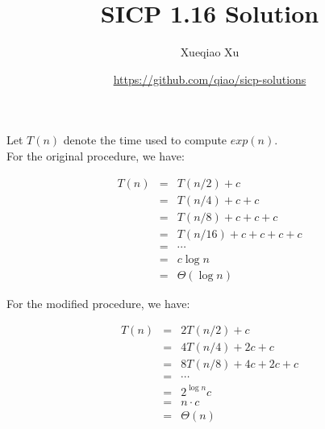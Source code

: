 \documentclass{article}
\begin{document}
\title{SICP 1.16 Solution}
\author{Xueqiao Xu}
\date{\url{https://github.com/qiao/sicp-solutions}}
\maketitle

Let $T(n)$ denote the time used to compute $exp(n)$.\\

For the original procedure, we have:

\begin{eqnarray}
    T(n) &=& T(n / 2) + c \nonumber \\
         &=& T(n / 4) + c + c\nonumber \\
         &=& T(n / 8) + c + c + c \nonumber \\
         &=& T(n / 16) + c + c + c + c \nonumber \\
         &=& \cdots \nonumber \\
         &=& c\log{n} \nonumber \\
         &=& \Theta(\log{n}) \nonumber
\end{eqnarray}

For the modified procedure, we have:

\begin{eqnarray}
    T(n) &=& 2T(n / 2) + c \nonumber \\
         &=& 4T(n / 4) + 2c + c \nonumber \\
         &=& 8T(n / 8) + 4c + 2c + c\nonumber \\
         &=& \cdots \nonumber \\
         &=& 2^{\log{n}}c \nonumber \\
         &=& n\cdot c \nonumber \\
         &=& \Theta(n) \nonumber
\end{eqnarray}
\end{document}

